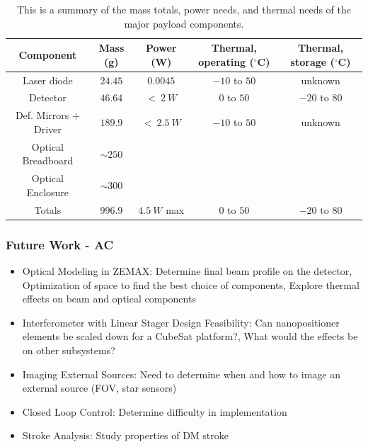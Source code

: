 \documentclass[12pt]{article}
\begin{document}
\begin{table}
\caption{This is a summary of the mass totals, power needs, and thermal needs of the major payload components.}
\label{fig:payload_summary_table}
\begin{tabular}{|c||c|c|c|c|} \hline
	Component & Mass (g) & Power (W) & Thermal, operating ($^\circ$C) & Thermal, storage ($^\circ$C) \\ \hline \hline
Laser diode & $24.45$ & $0.0045$ & $-10$ to $50$ & unknown \\
Detector & $46.64$ & $<\ 2\ W$ & $0$ to $50$ & $-20$ to $80$ \\
Def. Mirrors + Driver & $189.9$ & $<\ 2.5\ W$ & $-10$ to $50$ & unknown \\
Optical Breadboard & $\sim 250$ & ~ & ~ & \\
Optical Enclosure & $\sim 300$ & ~ & ~ & \\ \hline \hline
Totals & $996.9$ & $4.5\ W$ max & $0$ to $50$ & $-20$ to $80$ \\ \hline
\end{tabular}
\end{table}




			\subsubsection{Future Work - AC}

\begin{itemize}
\item{Optical Modeling in ZEMAX}: Determine final beam profile on the detector, Optimization of 
space to find the best choice of components, Explore thermal effects on beam and optical components

\item{Interferometer with Linear Stager Design Feasibility}: Can nanopositioner elements be scaled down for a CubeSat platform?, What would the effects be on other subsystems?

\item{Imaging External Sources}: Need to determine when and how to image an external source (FOV, star sensors)

\item{Closed Loop Control}: Determine difficulty in implementation

\item{Stroke Analysis}: Study properties of DM stroke

\end{itemize}
			
\end{document}
